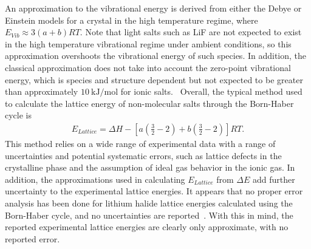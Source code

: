 \documentclass[titlepage,11pt]{article}
\begin{document}
An approximation to the vibrational energy is derived from either the Debye or Einstein models for a crystal in the high temperature regime, where $E_{Vib} \approx 3(a + b) R T$. Note that light salts such as LiF are not expected to exist in the high temperature vibrational regime under ambient conditions, so this approximation overshoots the vibrational energy of such species. In addition, the classical approximation does not take into account the zero-point vibrational energy, which is species and structure dependent but not expected to be greater than approximately $\SI{10}{\kilo\joule\per\mole}$ for ionic salts.~\cite{froyen1984} Overall, the typical method used to calculate the lattice energy of non-molecular salts through the Born-Haber cycle is
\begin{align}
E_{Lattice} =\Delta H - \left[ a \left( \frac { 3 } { 2 } - 2 \right) + b \left( \frac { 3 } { 2 } - 2 \right) \right] R T.
\end{align}
This method relies on a wide range of experimental data with a range of uncertainties and potential systematic errors, such as lattice defects in the crystalline phase and the assumption of ideal gas behavior in the ionic gas. In addition, the approximations used in calculating $E_{Lattice}$ from $\Delta E$ add further uncertainty to the experimental lattice energies. It appears that no proper error analysis has been done for lithium halide lattice energies calculated using the Born-Haber cycle, and no uncertainties are reported~\cite{book:CRC}. With this in mind, the reported experimental lattice energies are clearly only approximate, with no reported error.
\end{document}
